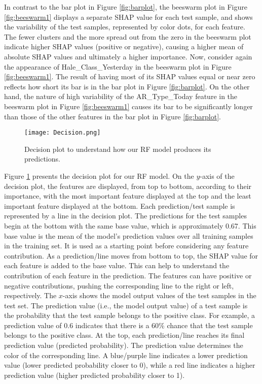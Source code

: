 \documentclass[draft]{agujournal2019}
\begin{document}
In contrast to the bar plot in Figure \ref{fig:barplot}, the beeswarm plot
in Figure \ref{fig:beeswarm1} displays a separate SHAP value for each test
sample, and shows the variability of the test samples, represented
by color dots, for each feature. 
The fewer clusters
and the more spread out from the zero in the beeswarm plot
indicate higher SHAP values (positive or negative), causing
a higher mean of absolute SHAP values and ultimately a
higher importance. Now, consider again the appearance of
Hale\_Class\_Yesterday in the beeswarm plot in Figure \ref{fig:beeswarm1}. The result of
having most of its SHAP values equal or near zero reflects
how short its bar is in the bar plot in 
Figure \ref{fig:barplot}.
On the other hand, the nature of high variability of the 
AR\_Type\_Today feature
in the beeswarm plot in 
Figure \ref{fig:beeswarm1}
causes its bar to be significantly
longer than those of the other features in the bar plot
in Figure \ref{fig:barplot}.

\begin{figure}
\centering
\hspace*{-0.7cm}
\texttt{[image: Decision.png]}
\caption{Decision plot to understand how our RF model produces
its predictions.}
\label{fig:dec1}
\end{figure}

Figure \ref{fig:dec1} 
presents the decision plot for our RF model.
On the $y$-axis of the decision plot, the features are displayed,
from top to bottom, according to their importance, with the most
important feature displayed at the top and the least important
feature displayed at the bottom. 
Each prediction/test sample
is represented by a line in the decision plot. The predictions
for the test samples begin at the bottom with the same base
value, which is approximately 0.67.
This base value is the
mean of the model's prediction values over all training samples
in the training set. It is used as a starting point before
considering any feature contribution. 
As a prediction/line moves from bottom to top, the SHAP value for each feature
is added to the base value. This can help to understand the
contribution of each feature in the prediction. The features
can have positive or negative contributions, pushing the corresponding
line to the right or left, respectively.
The $x$-axis shows the model output values of the test samples in the test set.
The prediction value (i.e., the model output value) of a test
sample is the probability that the test sample belongs to the
positive class. 
For example, a prediction value of 0.6 indicates
that there is a 60\% chance that the test sample belongs
to the positive class.
At the top, each prediction/line reaches
its final prediction value (predicted probability). 
The prediction value determines the color of the corresponding line. A blue/purple line indicates
a lower prediction value (lower predicted probability closer to 0), 
while a red line indicates a higher prediction
value (higher predicted probability closer to 1). 
\end{document}
